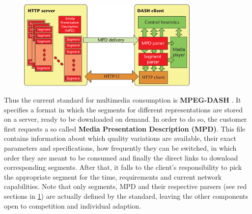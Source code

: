   \begin{figure}[ht]
  	\centering
  	\includegraphics[width=0.8\textwidth]{figures/DASH_scope.png}
  	\label{fig:fundamentals:DASH_scope}
  \end{figure}

Thus the current standard for multimedia consumption is \textbf{MPEG-DASH} \cite{Soda11}. It specifies a format in which the segments for different representations are stored on a server, ready to be downloaded on demand. In order to do so, the customer first requests a so called \textbf{Media Presentation Description (MPD)}. This file contains information about which quality variations are available, their exact parameters and specifications, how frequently they can be switched, in which order they are meant to be consumed and finally the direct links to download corresponding segments. After that, it falls to the client's responsibility to pick the appropriate segment for the time, requirements and current network capabilities. Note that only segments, MPD and their respective parsers (see red sections in \ref{fig:fundamentals:DASH_scope}) are actually defined by the standard, leaving the other components open to competition and individual adaption.


